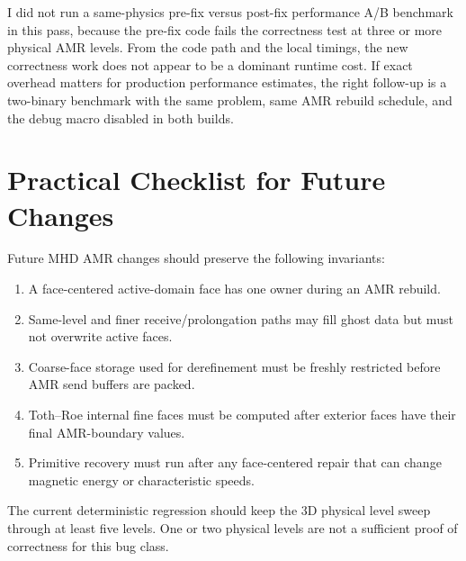 \documentclass[11pt]{article}
\begin{document}
I did not run a same-physics pre-fix versus post-fix performance A/B benchmark
in this pass, because the pre-fix code fails the correctness test at three or
more physical AMR levels.  From the code path and the local timings, the new
correctness work does not appear to be a dominant runtime cost.  If exact
overhead matters for production performance estimates, the right follow-up is a
two-binary benchmark with the same problem, same AMR rebuild schedule, and the
debug macro disabled in both builds.

\section{Practical Checklist for Future Changes}

Future MHD AMR changes should preserve the following invariants:
\begin{enumerate}
  \item A face-centered active-domain face has one owner during an AMR rebuild.
  \item Same-level and finer receive/prolongation paths may fill ghost data but
    must not overwrite active faces.
  \item Coarse-face storage used for derefinement must be freshly restricted
    before AMR send buffers are packed.
  \item Toth--Roe internal fine faces must be computed after exterior faces have
    their final AMR-boundary values.
  \item Primitive recovery must run after any face-centered repair that can
    change magnetic energy or characteristic speeds.
\end{enumerate}

The current deterministic regression should keep the 3D physical level sweep
through at least five levels.  One or two physical levels are not a sufficient
proof of correctness for this bug class.
\end{document}
